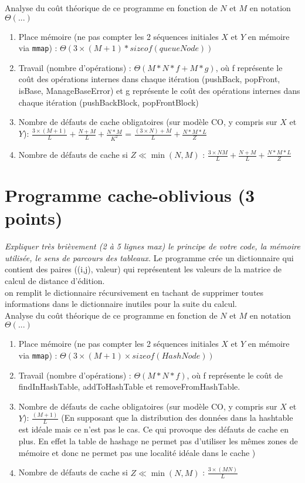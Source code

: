 \documentclass[10pt,a4paper]{article}
\begin{document}
Analyse du coût théorique de ce programme en fonction de $N$ et $M$ en notation $\Theta(...)$
\begin{enumerate}
  \item Place mémoire (ne pas compter les 2 séquences initiales $X$ et $Y$ en mémoire via {\tt mmap}) : $\Theta(3 \times(M+1)*sizeof(queueNode))$
  \item Travail (nombre d'opérations) : $\Theta(M * N * f + M * g )$, où f représente le coût des opérations internes dans chaque itération (pushBack, popFront, isBase, ManageBaseError) et g représente le coût des opérations internes dans chaque itération (pushBackBlock, popFrontBlock) \\
  \item Nombre de défauts de cache obligatoires (sur modèle CO, y compris sur $X$ et $Y$): $\frac{3 \times (M + 1)}{L} +\frac{N + M}{L} + \frac{N* M}{K^2}$ = $\frac{(3 \times N) + M}{L} + \frac{N* M * L}{Z} $ \\
  \item Nombre de défauts de cache si $Z \ll \min(N,M)$ : $\frac{3 \times N M}{L} +\frac{N + M}{L} + \frac{N* M * L}{Z}$ \\
\end{enumerate}

\section{Programme cache-oblivious (3 points)}
{\em Expliquer très brièvement (2 à 5 lignes max) le principe de votre code, la mémoire utilisée, le sens de parcours des tableaux.}
Le programme crée un dictionnaire qui contient des paires ((i,j), valeur) qui représentent les valeurs de la matrice de calcul de distance d'édition.\\
on remplit le dictionnaire récursivement en tachant de supprimer toutes informations dans le dictionnaire inutiles pour la suite du calcul. \\
Analyse du coût théorique de ce programme en fonction de $N$ et $M$ en notation $\Theta(...)$
\begin{enumerate}
  \item Place mémoire (ne pas compter les 2 séquences initiales $X$ et $Y$ en mémoire via {\tt mmap}) : $\Theta( 3 \times(M + 1)\times sizeof(HashNode))$
  \item Travail (nombre d'opérations) : $\Theta(M * N * f)$, où f représente le coût de findInHashTable, addToHashTable et removeFromHashTable.\\ 
  \item Nombre de défauts de cache obligatoires (sur modèle CO, y compris sur $X$ et $Y$): $ \frac{ (M+1)}{L} $ (En supposant que la distribution des 
  données dans la hashtable est idéale mais ce n'est pas le cas. Ce qui provoque des défauts de cache en plus. En effet la table de hashage ne permet pas d'utiliser les mêmes zones de mémoire et donc 
  ne permet pas une localité idéale dans le cache ) \\
  \item Nombre de défauts de cache si $Z \ll \min(N,M)$ : $ \frac{3 \times (M N)}{L} $
\end{enumerate}
\end{document}
